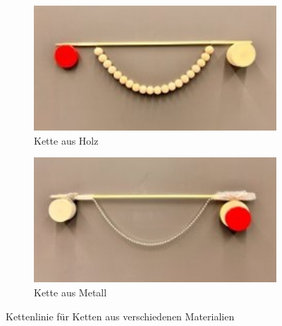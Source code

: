 \begin{figure}
	\centering
	\begin{subfigure}{0.5\textwidth}
		\centering
		\includegraphics[width=1\textwidth]{papers/kettenlinie/images/kettenlinie_holz.jpg}
		\caption{Kette aus Holz}
		\label{fig:kettenlinie-materialien-holz}
	\end{subfigure}\hfill
	\begin{subfigure}{0.5\textwidth}
		\centering
		\includegraphics[width=1\textwidth]{papers/kettenlinie/images/kettenlinie_metall.jpg}
		\caption{Kette aus Metall}
		\label{fig:kettenlinie-materialien-metall}
	\end{subfigure}
	\caption{Kettenlinie für Ketten aus verschiedenen Materialien
	\label{fig:kettenlinie-materialien}}
\end{figure}
